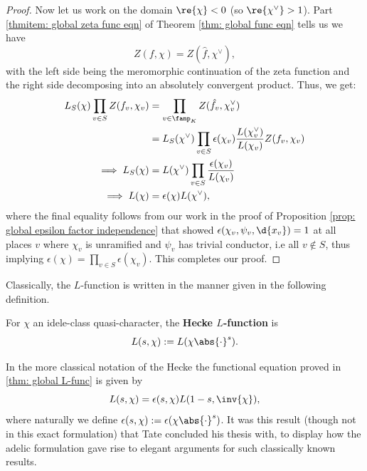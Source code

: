 \documentclass[11pt, x11names, openany]{book}
\begin{document}
\begin{proof}
Now let us work on the domain $\re{\chi} < 0$ (so $\re{\chi^\lor} > 1$). Part \ref{thmitem: global zeta func eqn} of Theorem \ref{thm: global func eqn} tells us we have
\begin{equation*}
    Z(f, \chi) = Z(\hat{f}, \chi^\lor),
\end{equation*}
with the left side being the meromorphic continuation of the zeta function and the right side decomposing into an absolutely convergent product. Thus, we get:
\begin{align*}
L_S(\chi) \prod_{v \in S} Z(f_v, \chi_v) &= \prod_{v \in \fanp_K} Z(\hat{f_v}, \chi_v^\lor)\\
&= L_S(\chi^\lor) \prod_{v \in S} \epsilon(\chi_v) \frac{L(\chi_v^\lor)}{L(\chi_v)} Z(f_v, \chi_v)\\
\implies L_S(\chi) &= L(\chi^\lor) \prod_{v \in S} \frac{\epsilon(\chi_v)}{L(\chi_v)}\\
\implies L(\chi) &= \epsilon(\chi) L(\chi^\lor),
\end{align*}
where the final equality follows from our work in the proof of Proposition \ref{prop: global epsilon factor independence} that showed $\epsilon(\chi_v, \psi_v, \d{x_v}) = 1$ at all places $v$ where $\chi_v$ is unramified and $\psi_v$ has trivial conductor, i.e all $v \notin S$, thus implying $\epsilon(\chi) = \prod_{v \in S} \epsilon(\chi_v)$. This completes our proof.
\end{proof}

Classically, the $L$-function is written in the manner given in the following definition.

\begin{defn}
    \label{def: Hecke-L function}
For $\chi$ an idele-class quasi-character, the \textbf{Hecke $L$-function} is
\begin{equation*}
    L(s, \chi) := L(\chi \abs{\cdot}^s).
\end{equation*}
\end{defn}


In the more classical notation of the Hecke  the functional equation proved in \ref{thm: global L-func} is given by
\begin{equation*}
    L(s, \chi) = \epsilon(s, \chi) L(1-s, \inv{\chi}),
\end{equation*}
where naturally we define $\epsilon(s, \chi) := \epsilon(\chi \abs{\cdot}^s)$.
It was this result (though not in this exact formulation) that Tate concluded his thesis with, to display how the adelic formulation gave rise to elegant arguments for such classically known results.
\end{document}
